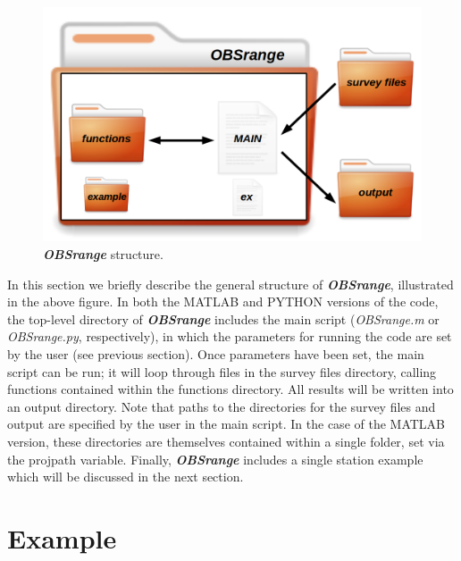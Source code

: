 \documentclass[titlepage]{article}
\begin{document}
   \begin{figure}[h]
    \includegraphics[width=\linewidth]{OBSrange_structure.png}
    \caption{\textbf{\textit{OBSrange}} structure.}
   \end{figure}

   In this section we briefly describe the general structure of \textbf{\textit{OBSrange}},  illustrated in the above figure. In both the MATLAB and PYTHON versions of the code, the top-level directory of \textbf{\textit{OBSrange}} includes the main script (\textit{OBSrange.m} or \textit{OBSrange.py}, respectively), in which the parameters for running the code are set by the user (see previous section). Once parameters have been set, the main script can be run; it will loop through files in the survey files directory, calling functions contained within the functions directory. All results will be written into an output directory. Note that paths to the directories for the survey files and output are specified by the user in the main script. In the case of the MATLAB version, these directories are themselves contained within a single folder, set via the projpath variable. Finally, \textbf{\textit{OBSrange}} includes a single station example which will be discussed in the next section.

 
 \section{Example}
\end{document}
